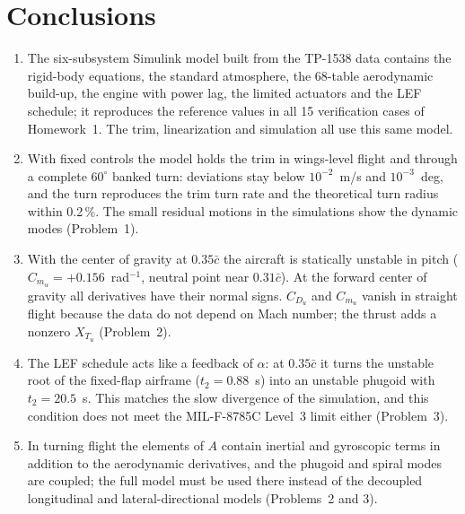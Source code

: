 \documentclass[conf]{new-aiaa}
\begin{document}
\section{Conclusions}
\begin{enumerate}
\item The six-subsystem Simulink model built from the TP-1538 data contains the rigid-body equations, the standard atmosphere, the 68-table aerodynamic build-up, the engine with power lag, the limited actuators and the LEF schedule; it reproduces the reference values in all 15 verification cases of Homework~1. The trim, linearization and simulation all use this same model.
\item With fixed controls the model holds the trim in wings-level flight and through a complete $60^\circ$ banked turn: deviations stay below $10^{-2}$~m/s and $10^{-3}$~deg, and the turn reproduces the trim turn rate and the theoretical turn radius within 0.2\,\%. The small residual motions in the simulations show the dynamic modes (Problem~1).
\item With the center of gravity at $0.35\bar c$ the aircraft is statically unstable in pitch ($C_{m_\alpha}=+0.156$~rad$^{-1}$, neutral point near $0.31\bar c$). At the forward center of gravity all derivatives have their normal signs. $C_{D_u}$ and $C_{m_u}$ vanish in straight flight because the data do not depend on Mach number; the thrust adds a nonzero $X_{T_u}$ (Problem~2).
\item The LEF schedule acts like a feedback of $\alpha$: at $0.35\bar c$ it turns the unstable root of the fixed-flap airframe ($t_2=0.88$~s) into an unstable phugoid with $t_2=20.5$~s. This matches the slow divergence of the simulation, and this condition does not meet the MIL-F-8785C Level~3 limit either (Problem~3).
\item In turning flight the elements of $A$ contain inertial and gyroscopic terms in addition to the aerodynamic derivatives, and the phugoid and spiral modes are coupled; the full model must be used there instead of the decoupled longitudinal and lateral-directional models (Problems~2 and 3).
\end{enumerate}
\end{document}
